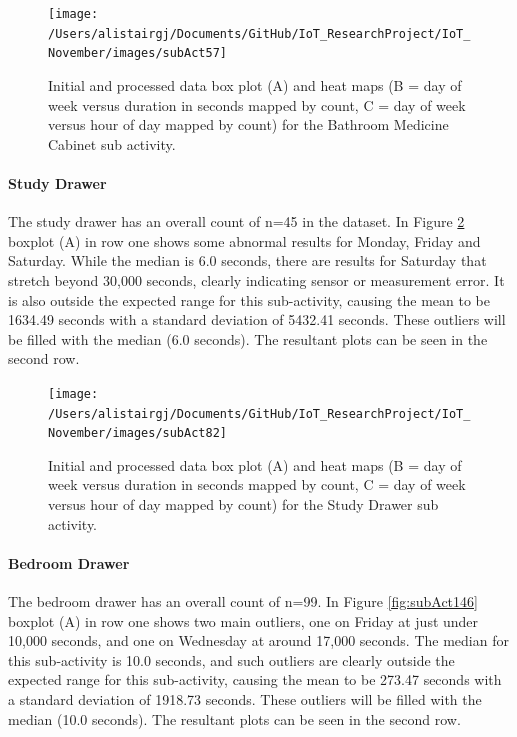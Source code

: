 \documentclass[11pt,]{article}
\let\oldparagraph\paragraph
\renewcommand{\paragraph}[1]{\oldparagraph{#1}\mbox{}}
\begin{document}
\begin{figure}[H]

{\centering \texttt{[image: /Users/alistairgj/Documents/GitHub/IoT\_ResearchProject/IoT\_November/images/subAct57]} 

}

\caption{Initial and processed data box plot (A) and heat maps (B = day of week versus duration in seconds mapped by count, C = day of week versus hour of day mapped by count) for the Bathroom Medicine Cabinet sub activity.}\label{fig:subAct57}
\end{figure}

\hypertarget{study-drawer}{%
\paragraph{Study Drawer}\label{study-drawer}}

The study drawer has an overall count of n=45 in the dataset. In Figure
\ref{fig:subAct82} boxplot (A) in row one shows some abnormal results
for Monday, Friday and Saturday. While the median is 6.0 seconds, there
are results for Saturday that stretch beyond 30,000 seconds, clearly
indicating sensor or measurement error. It is also outside the expected
range for this sub-activity, causing the mean to be 1634.49 seconds with
a standard deviation of 5432.41 seconds. These outliers will be filled
with the median (6.0 seconds). The resultant plots can be seen in the
second row.

\begin{figure}[H]

{\centering \texttt{[image: /Users/alistairgj/Documents/GitHub/IoT\_ResearchProject/IoT\_November/images/subAct82]} 

}

\caption{Initial and processed data box plot (A) and heat maps (B = day of week versus duration in seconds mapped by count, C = day of week versus hour of day mapped by count) for the Study Drawer sub activity.}\label{fig:subAct82}
\end{figure}

\hypertarget{bedroom-drawer}{%
\paragraph{Bedroom Drawer}\label{bedroom-drawer}}

The bedroom drawer has an overall count of n=99. In Figure
\ref{fig:subAct146} boxplot (A) in row one shows two main outliers, one
on Friday at just under 10,000 seconds, and one on Wednesday at around
17,000 seconds. The median for this sub-activity is 10.0 seconds, and
such outliers are clearly outside the expected range for this
sub-activity, causing the mean to be 273.47 seconds with a standard
deviation of 1918.73 seconds. These outliers will be filled with the
median (10.0 seconds). The resultant plots can be seen in the second
row.
\end{document}
